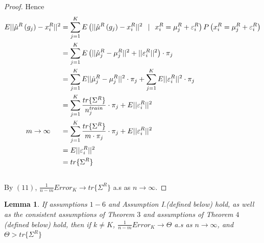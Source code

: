 \documentclass[11pt]{article}
\newtheorem{lemma}{Lemma}
\begin{document}
\begin{proof}
Hence
\begin{align} \nonumber
  E||\hat{\mu}^R \left(g_j\right) - x^R_i||^2  & = \sum^K_{j=1}E\left(||\hat{\mu}^R \left(g_j\right) - x^R_i||^2  \hspace{0.1 in}| \hspace{0.1 in} x^R_i = \mu^R_{j} + \varepsilon^R_i\right) P\left(x^R_i = \mu^R_{j} + \varepsilon^R_i\right)\\ \nonumber
   & = \sum^K_{j=1}E\left(||\hat{\mu}^R_{j} -\mu^R_{j}||^2 +||\varepsilon^R_i||^2\right)\cdot\pi_j \\ \nonumber
   &= \sum^K_{j=1}E||\hat{\mu}^R_{j} -\mu^R_{j}||^2\cdot\pi_j + \sum^K_{j=1}E||\varepsilon^R_i||^2\cdot\pi_j\\ \nonumber
    &= \sum^K_{j=1} \frac{tr\{\Sigma^R\}}{n^{train}_j}\cdot\pi_j + E||\varepsilon^R_i||^2\\ \nonumber
  m \to \infty \hspace{0.2in}  &= \sum^K_{j=1} \frac{tr\{\Sigma^R\}}{m\cdot\pi_j }\cdot\pi_j + E||\varepsilon^R_i||^2\\ \nonumber
      &= E||\varepsilon^R_i||^2\\ \nonumber
       &=tr\{\Sigma^R\} \\ \nonumber
\end{align} 
By $(11)$, $\frac{1}{n-m} Error_K \to tr\{\Sigma^R\}$ a.s as $n \to \infty$.
\end{proof}
\begin{lemma}
	If assumptions $1-6$ and Assumption I.(defined below) hold, as well as the consistent assumptions of Theorem $3$ and assumptions of Theorem $4$ (defined below) hold,  then if $k \neq K$, $\frac{1}{n-m} Error_K \to \Theta$ a.s as $n \to \infty$, and $\Theta > tr\{\Sigma^R\} $
\end{lemma}
\end{document}
